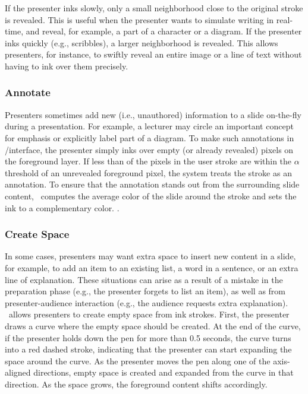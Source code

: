 If the presenter inks slowly, only a small neighborhood close to the original stroke is revealed. This is useful when the presenter wants to simulate writing in real-time, and reveal, for example, a part of a character or a diagram.
%
If the presenter inks quickly (e.g., scribbles), a larger neighborhood is revealed. This allows presenters, for instance, to swiftly reveal an entire image or a line of text without having to ink over them precisely.   
\fi

\subsubsection{Annotate}
Presenters sometimes add new (i.e., unauthored) information to a slide on-the-fly during a presentation.
%
For example, a lecturer may circle an important concept for emphasis or explicitly label part of a diagram.
%
To make such annotations in /interface, the presenter simply inks over empty (or already revealed) pixels on the foreground layer. If less than  of the pixels in the user stroke are within the $\alpha$ threshold of an unrevealed foreground pixel, the system treats the stroke as an annotation. To ensure that the annotation stands out from the surrounding slide content, \interface\ computes the average color of the slide around the stroke and sets the ink to a complementary color. . 

\subsubsection{Create Space}
In some cases, presenters may want extra space to insert new content in a slide, for example, to add an item to an existing list, a word in a sentence, or an extra line of explanation. These situations can arise as a result of a mistake in the preparation phase (e.g., the presenter forgets to list an item), as well as from presenter-audience interaction (e.g., the audience requests extra explanation). \interface\ allows presenters to create empty space from ink strokes. First, the presenter draws a curve where the empty space should be created. At the end of the curve, if the presenter holds down the pen for more than 0.5 seconds, the curve turns into a red dashed stroke, indicating that the presenter can start expanding the space around the curve. As the presenter moves the pen along one of the axis-aligned directions, empty space is created and expanded from the curve in that direction.  As the space grows, the foreground content shifts accordingly. 
